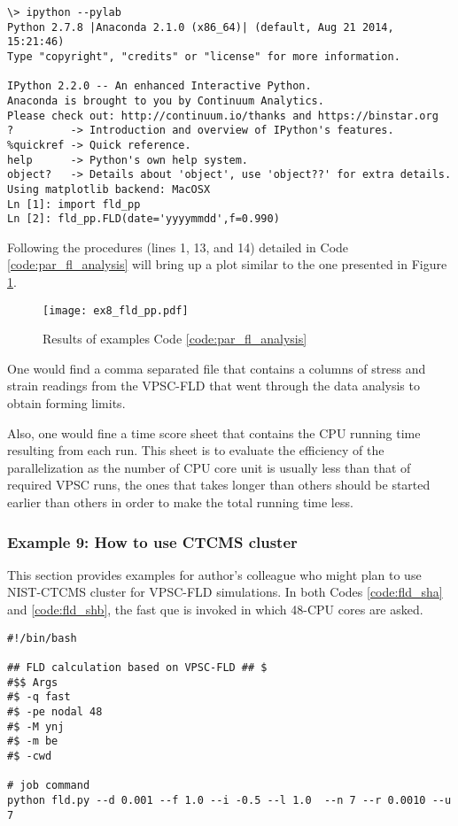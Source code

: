 \documentclass[12pt]{amsart}
\begin{document}
\begin{lstlisting}[style=sh, caption=An example use of fld\_pp.py, label={code:par_fl_analysis}]
  \> ipython --pylab
Python 2.7.8 |Anaconda 2.1.0 (x86_64)| (default, Aug 21 2014, 15:21:46)
Type "copyright", "credits" or "license" for more information.

IPython 2.2.0 -- An enhanced Interactive Python.
Anaconda is brought to you by Continuum Analytics.
Please check out: http://continuum.io/thanks and https://binstar.org
?         -> Introduction and overview of IPython's features.
%quickref -> Quick reference.
help      -> Python's own help system.
object?   -> Details about 'object', use 'object??' for extra details.
Using matplotlib backend: MacOSX
Ln [1]: import fld_pp
Ln [2]: fld_pp.FLD(date='yyyymmdd',f=0.990)
\end{lstlisting}
Following the procedures (lines 1, 13, and 14) detailed in Code \ref{code:par_fl_analysis} will bring up a plot similar to the one presented in Figure \ref{fig:rst_ex8}.
\begin{figure}
  \texttt{[image: ex8\_fld\_pp.pdf]}
  \caption{Results of examples Code \ref{code:par_fl_analysis}}
  \label{fig:rst_ex8}
\end{figure}

One would find a comma separated file that contains a columns of stress and strain readings from the VPSC-FLD that went through the data analysis to obtain forming limits.

Also, one would fine a time score sheet that contains the CPU running time resulting from each run.
This sheet is to evaluate the efficiency of the parallelization as the number of CPU core unit is usually less than that of required VPSC runs, the ones that takes longer than others should be started earlier than others in order to make the total running time less.


\newpage
\subsubsection{Example 9: How to use CTCMS cluster}
\label{sec:par_ctcms}
This section provides examples for author's colleague who might plan to use NIST-CTCMS cluster for VPSC-FLD simulations.
In both Codes \ref{code:fld_sha} and \ref{code:fld_shb}, the fast que is invoked in which 48-CPU cores are asked.

\begin{lstlisting}[style=sh, caption=Shell script that can be submitted to the CTCMS cluster for region \textbf{A} simulations,label={code:fld_sha}]
#!/bin/bash

## FLD calculation based on VPSC-FLD ## $
#$$ Args
#$ -q fast
#$ -pe nodal 48
#$ -M ynj
#$ -m be
#$ -cwd

# job command
python fld.py --d 0.001 --f 1.0 --i -0.5 --l 1.0  --n 7 --r 0.0010 --u 7
\end{lstlisting}
\end{document}
